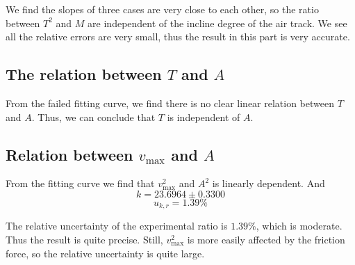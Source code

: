 We find the slopes of three cases are very close to each other, 
so the ratio between $T^2$ and $M$  are independent of the incline degree of the air track.
We see all the relative errors are very small,
thus the result in this part is very accurate.

\subsection{The relation between $T$ and  $A$}

From the failed fitting curve, we find there is no clear linear relation between $T$ and $A$.
Thus, we can conclude that $T$ is independent of $A$.


\subsection{Relation between $ v_{\max}$ and $A$}

From the fitting curve we find that  $v_{\max}^2$ and $A^2$ is linearly dependent.
And 
$$ k =   23.6964 \pm 0.3300  $$
$$ u_{k,r} = 1.39 \% $$

The relative uncertainty of the experimental ratio is $1.39\%$, 
which is moderate. 
Thus the result is quite precise.
Still, $v_{\max}^2$ is more easily affected by the friction force, so the relative uncertainty is quite large. 
